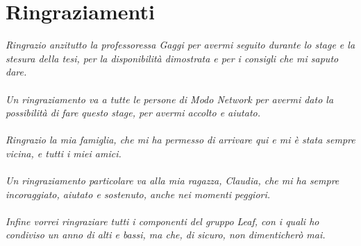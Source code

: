 \section*{Ringraziamenti}
\textit{Ringrazio anzitutto la professoressa Gaggi per avermi seguito durante lo stage e la stesura della tesi, per la disponibilità dimostrata e per i consigli che mi saputo dare. \\\\
Un ringraziamento va a tutte le persone di Modo Network per avermi dato la possibilità di fare questo stage, per avermi accolto e aiutato.\\\\
Ringrazio la mia famiglia, che mi ha permesso di arrivare qui e mi è stata sempre vicina, e tutti i miei amici.\\\\
Un ringraziamento particolare va alla mia ragazza, Claudia, che mi ha sempre incoraggiato, aiutato e sostenuto, anche nei momenti peggiori.\\\\
Infine vorrei ringraziare tutti i componenti del gruppo Leaf, con i quali ho condiviso un anno di alti e bassi, ma che, di sicuro, non dimenticherò mai.}